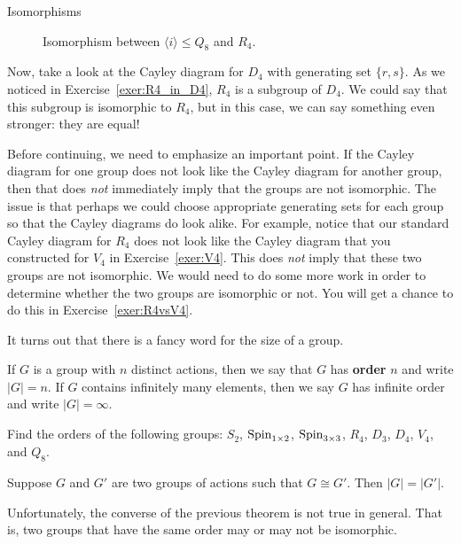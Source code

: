 \begin{section}{Isomorphisms}
\begin{figure}[!ht]
\begin{tikzpicture}[scale=1.5,auto]
\end{tikzpicture}
\caption{Isomorphism between $\langle i\rangle\leq Q_8$ and $R_4$.}\label{fig:isoR4}
\label{fig:rotation6}
\end{figure}

Now, take a look at the Cayley diagram for $D_4$ with generating set $\{r,s\}$.  As we noticed in Exercise~\ref{exer:R4_in_D4}, $R_4$ is a subgroup of $D_4$.  We could say that this subgroup is isomorphic to $R_4$, but in this case, we can say something even stronger: they are equal!

Before continuing, we need to emphasize an important point.  If the Cayley diagram for one group does not look like the Cayley diagram for another group, then that does \emph{not} immediately imply that the groups are not isomorphic.  The issue is that perhaps we could choose appropriate generating sets for each group so that the Cayley diagrams do look alike.  For example, notice that our standard Cayley diagram for $R_4$ does not look like the Cayley diagram that you constructed for $V_4$ in Exercise~\ref{exer:V4}.  This does \emph{not} imply that these two groups are not isomorphic.  We would need to do some more work in order to determine whether the two groups are isomorphic or not.  You will get a chance to do this in Exercise~\ref{exer:R4vsV4}.

It turns out that there is a fancy word for the size of a group.

\begin{definition}
If $G$ is a group with $n$ distinct actions, then we say that $G$ has \textbf{order} $n$ and write $|G|=n$.  If $G$ contains infinitely many elements, then we say $G$ has infinite order and write $|G|=\infty$.
\end{definition}

\begin{exercise}
Find the orders of the following groups: $S_2$, $\Spin_{1\times 2}$, $\Spin_{3\times 3}$, $R_4$, $D_3$, $D_4$, $V_4$, and $Q_8$.
\end{exercise}

\begin{theorem}\label{thm:iso_same_order}
Suppose $G$ and $G'$ are two groups of actions such that $G\cong G'$.  Then $|G|=|G'|$.
\end{theorem}

Unfortunately, the converse of the previous theorem is not true in general.  That is, two groups that have the same order may or may not be isomorphic.


\end{section}

